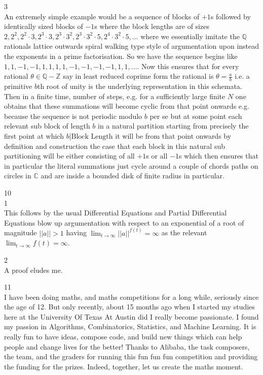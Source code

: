 3 \\
An extremely simple example would be a sequence of blocks of $+1$s followed by identically sized blocks of $-1$s where the block lengths are of sizes $2,2^2,2^2 \cdot 3,2^3 \cdot 3,2^3 \cdot 3^2,2^3 \cdot 3^2 \cdot 5,2^4 \cdot 3^2 \cdot 5,\dots$ where we essentially imitate the $\mathbb{Q}$ rationals lattice outwards spiral walking type style of argumentation upon instead the exponents in a prime factorisation. So we have the sequence begins like $1,1,-1,-1,1,1,1,1,-1,-1,-1,-1,1,1,\dots$. Now this ensures that for every rational $\theta \in \mathbb{Q} - \mathbb{Z}$ say in least reduced coprime form the rational is $\theta = \frac{a}{b}$ i.e. a primitive $b$th root of unity is the underlying representation in this schemata. Then in a finite time, number of steps, e.g. for a sufficiently large finite $N$ one obtains that these summations will become cyclic from that point onwards e.g. because the sequence is not periodic modulo $b$ per se but at some point each relevant sub block of length $b$ in a natural partition starting from precisely the first point at which $b | \text{Block Length}$ it will be from that point onwards by definition and construction the case that each block in this natural sub partitioning will be either consisting of all $+1$s or all $-1$s which then ensures that in particular the literal summations just cycle around a couple of chords paths on circles in $\mathbb{C}$ and are inside a bounded disk of finite radius in particular.

10 \\
1 \\
This follows by the usual Differential Equations and Partial Differential Equations blow up argumentation with respect to an exponential of a root of magnitude $||a|| > 1$ having $\lim_{t \to \infty} ||a||^{f(t)} = \infty$ as the relevant $\lim_{t \to \infty} f(t) = \infty$.

2 \\
A proof eludes me.

11 \\
I have been doing maths, and maths competitions for a long while, seriously since the age of 12. But only recently, about 15 months ago when I started my studies here at the University Of Texas At Austin did I really become passionate. I found my passion in Algorithms, Combinatorics, Statistics, and Machine Learning. It is really fun to have ideas, compose code, and build new things which can help people and change lives for the better! Thanks to Alibaba, the task composers, the team, and the graders for running this fun fun fun competition and providing the funding for the prizes. Indeed, together, let us create the maths moment.


